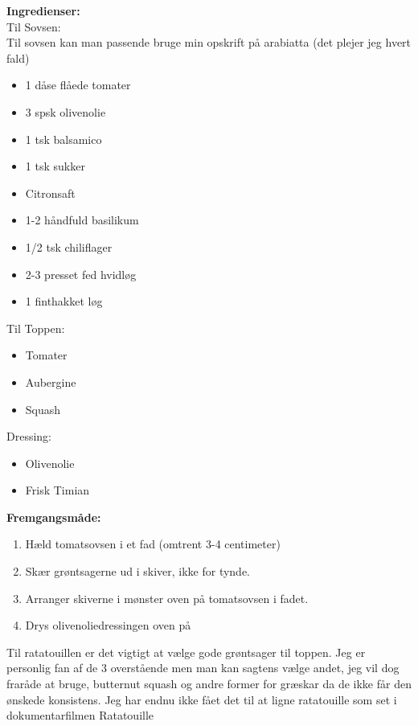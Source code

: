 \documentclass{book}
\begin{document}
\begin{minipage}[t]{0.5\textwidth}
\textbf{Ingredienser:}
\\ Til Sovsen:
\\ Til sovsen kan man passende bruge min opskrift på arabiatta (det plejer jeg hvert fald)
\begin{itemize}
    \item 1 dåse flåede tomater
    \item 3 spsk olivenolie
    \item 1 tsk balsamico
    \item 1 tsk sukker
    \item Citronsaft
    \item 1-2 håndfuld basilikum
    \item 1/2 tsk chiliflager 
    \item 2-3 presset fed hvidløg
    \item 1 finthakket løg
\end{itemize}
Til Toppen:
\begin{itemize}
    \item Tomater
    \item Aubergine
    \item Squash 
\end{itemize}
Dressing:
\begin{itemize}
    \item Olivenolie
    \item Frisk Timian
\end{itemize}
\end{minipage}
\begin{minipage}[t]{0.5\textwidth}
\textbf{Fremgangsmåde:}
    \begin{enumerate}
        \item Hæld tomatsovsen i et fad (omtrent 3-4 centimeter)
        \item Skær grøntsagerne ud i skiver, ikke for tynde.
        \item Arranger skiverne i mønster oven på tomatsovsen i fadet.
        \item Drys olivenoliedressingen oven på
   \end{enumerate}

\end{minipage}
Til ratatouillen er det vigtigt at vælge gode grøntsager til toppen. Jeg er personlig fan af de 3 overstående men man kan sagtens vælge andet, jeg vil dog fraråde at bruge, butternut squash og andre former for græskar da de ikke får den ønskede konsistens. Jeg har endnu ikke fået det til at ligne ratatouille som set i dokumentarfilmen Ratatouille 
\end{document}
